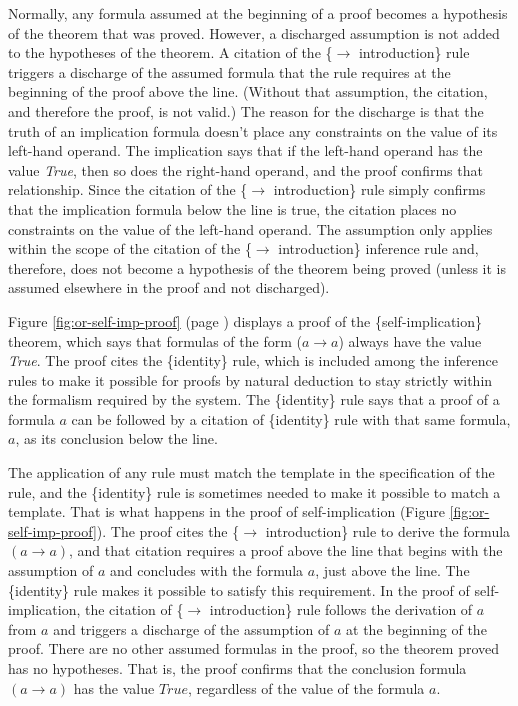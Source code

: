 {Normally, any formula assumed at the beginning of a proof
becomes a hypothesis of the theorem that was proved.
However, a
discharged
assumption
is not added to the hypotheses of the theorem.
A citation of the
\{$\rightarrow$ introduction\} rule
triggers a discharge of the assumed formula that the
rule requires at the beginning of the proof above the line.
(Without that assumption, the citation,
and therefore the proof, is not valid.)
The reason for the discharge is that the truth of an implication
formula doesn't place any constraints on the value of its
left-hand operand.
The implication says that if the left-hand operand
has the value \emph{True}, then so does the right-hand operand,
and the proof confirms that relationship.
Since the citation of the
\{$\rightarrow$ introduction\} rule
simply confirms that the implication formula below the line
is true, the citation places no constraints on the value
of the left-hand operand.
The assumption only applies within the scope
of the citation of the \{$\rightarrow$ introduction\} inference rule
and, therefore, does not become a hypothesis of the theorem being proved
(unless it is assumed elsewhere in the proof and not discharged).

Figure \ref{fig:or-self-imp-proof} (page \pageref{fig:or-self-imp-proof})
displays a proof of the \{self-implication\} theorem,
which says that formulas of the form ($a \rightarrow a$) always have the value \emph{True}.
The proof cites the \{identity\} rule,
which is included among the inference rules to make it
possible for proofs by natural deduction to stay strictly
within the formalism required by the system.
The \{identity\} rule says that a proof of a formula $a$
can be followed by a citation of \{identity\} rule
with that same formula, $a$, as its conclusion below the line.

The application of any rule must match
the template in the specification of the rule,
and the \{identity\} rule is sometimes needed to make it possible to match a template.
That is what happens in the proof of self-implication (Figure \ref{fig:or-self-imp-proof}).
The proof cites the \{$\rightarrow$ introduction\} rule
to derive the formula $(a \rightarrow a)$,
and that citation requires
a proof above the line that begins with the assumption of $a$
and concludes with the formula $a$, just above the line.
The \{identity\} rule makes it possible to satisfy this requirement.
In the proof of self-implication,
the citation of \{$\rightarrow$ introduction\} rule follows
the derivation of $a$ from $a$ and triggers a discharge
of the assumption of $a$ at the beginning of the proof.
There are no other assumed formulas in the proof,
so the theorem proved has no hypotheses.
That is, the proof confirms that the conclusion formula
$(a \rightarrow a)$ has the value $True$, regardless of
the value of the formula $a$.

}

